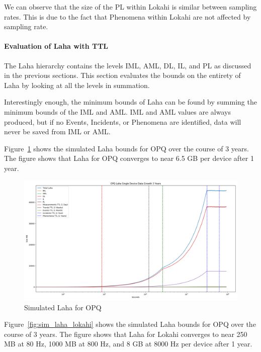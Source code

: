 We can observe that the size of the PL within Lokahi is similar between sampling rates. This is due to the fact that Phenomena within Lokahi are not affected by sampling rate.

\paragraph{Evaluation of Laha with TTL}

The Laha hierarchy contains the levels IML, AML, DL, IL, and PL as discussed in the previous sections. This section evaluates the bounds on the entirety of Laha by looking at all the levels in summation.

Interestingly enough, the minimum bounds of Laha can be found by summing the minimum bounds of the IML and AML. IML and AML values are always produced, but if no Events, Incidents, or Phenomena are identified, data will never be saved from IML or AML\@.

Figure~\ref{fig:sim_laha_opq} shows the simulated Laha bounds for OPQ over the course of 3 years. The figure shows that Laha for OPQ converges to near 6.5 GB per device after 1 year.

\begin{figure}[H]
	\centering
	\includegraphics[width=\linewidth]{figures/sim_laha_opq.png}
	\caption{Simulated Laha for OPQ}
	\label{fig:sim_laha_opq}
\end{figure}

Figure~\ref{fig:sim_laha_lokahi} shows the simulated Laha bounds for OPQ over the course of 3 years. The figure shows that Laha for Lokahi converges to near 250 MB at 80 Hz, 1000 MB at 800 Hz, and 8 GB at 8000 Hz per device after 1 year.

